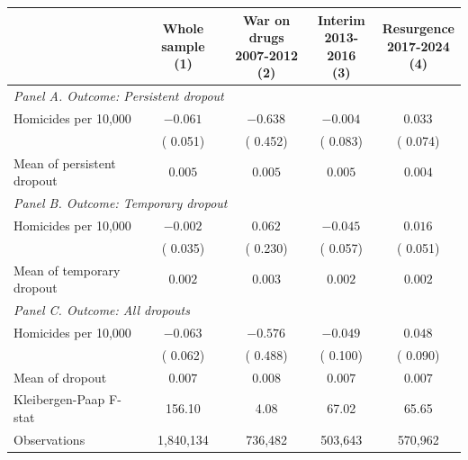\begin{tabular}{l c c c c}
\hline\hline
 & \shortstack{Whole sample \\ (1)} & \shortstack{War on drugs \\ 2007-2012 \\ (2)} & \shortstack{Interim \\ 2013-2016 \\ (3)} & \shortstack{Resurgence \\ 2017-2024 \\ (4)} \\
\hline
\multicolumn{5}{l}{{\small \textit{Panel A. Outcome: Persistent dropout}}} \\
Homicides per 10,000
 & $-0.061^{}$ & $-0.638^{}$ & $-0.004^{}$ & $ 0.033^{}$ \\
 & ( 0.051) & ( 0.452) & ( 0.083) & ( 0.074) \\
Mean of persistent dropout
 & $ 0.005$ & $ 0.005$ & $ 0.005$ & $ 0.004$ \\
\hline
\multicolumn{5}{l}{{\small \textit{Panel B. Outcome: Temporary dropout}}} \\
Homicides per 10,000
 & $-0.002^{}$ & $ 0.062^{}$ & $-0.045^{}$ & $ 0.016^{}$ \\
 & ( 0.035) & ( 0.230) & ( 0.057) & ( 0.051) \\
Mean of temporary dropout
 & $ 0.002$ & $ 0.003$ & $ 0.002$ & $ 0.002$ \\
\hline
\multicolumn{5}{l}{{\small \textit{Panel C. Outcome: All dropouts}}} \\
Homicides per 10,000
 & $-0.063^{}$ & $-0.576^{}$ & $-0.049^{}$ & $ 0.048^{}$ \\
 & ( 0.062) & ( 0.488) & ( 0.100) & ( 0.090) \\
Mean of dropout
 & $ 0.007$ & $ 0.008$ & $ 0.007$ & $ 0.007$ \\
\hline
Kleibergen-Paap F-stat
 & 156.10 &   4.08 &  67.02 &  65.65 \\
\hline
Observations
 & 1,840,134 &   736,482 &   503,643 &   570,962 \\
\hline\hline
\end{tabular}
